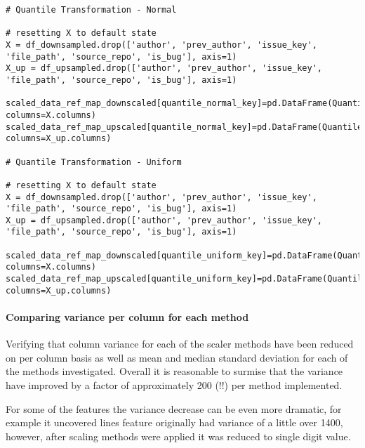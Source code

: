 \begin{landscape}
\begin{code}
\begin{verbatim}
# Quantile Transformation - Normal

# resetting X to default state
X = df_downsampled.drop(['author', 'prev_author', 'issue_key', 'file_path', 'source_repo', 'is_bug'], axis=1)
X_up = df_upsampled.drop(['author', 'prev_author', 'issue_key', 'file_path', 'source_repo', 'is_bug'], axis=1)

scaled_data_ref_map_downscaled[quantile_normal_key]=pd.DataFrame(QuantileTransformer(output_distribution='normal').fit_transform(X), columns=X.columns)
scaled_data_ref_map_upscaled[quantile_normal_key]=pd.DataFrame(QuantileTransformer(output_distribution='normal').fit_transform(X_up), columns=X_up.columns)

# Quantile Transformation - Uniform

# resetting X to default state
X = df_downsampled.drop(['author', 'prev_author', 'issue_key', 'file_path', 'source_repo', 'is_bug'], axis=1)
X_up = df_upsampled.drop(['author', 'prev_author', 'issue_key', 'file_path', 'source_repo', 'is_bug'], axis=1)

scaled_data_ref_map_downscaled[quantile_uniform_key]=pd.DataFrame(QuantileTransformer(output_distribution='uniform').fit_transform(X), columns=X.columns)
scaled_data_ref_map_upscaled[quantile_uniform_key]=pd.DataFrame(QuantileTransformer(output_distribution='uniform').fit_transform(X_up), columns=X_up.columns)
\end{verbatim}
\end{code}
\end{landscape}

\paragraph{Comparing variance per column for each method}
Verifying that column variance for each of the scaler methods have been reduced on per column basis as well as mean and median standard deviation for each of the methods investigated. Overall it is reasonable to surmise that the variance have improved by a factor of approximately 200 (!!) per method implemented.

For some of the features the variance decrease can be even more dramatic, for example it uncovered lines feature originally had variance of a little over 1400, however, after scaling methods were applied it was reduced to single digit value.

